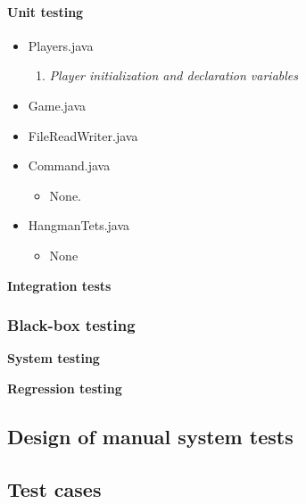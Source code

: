 \documentclass{article}
\begin{document}
\paragraph{Unit testing}%


\begin{itemize}
\item Players.java
\begin{enumerate}
\item
\textit{Player initialization and declaration variables}
\end{enumerate}


\item Game.java
\item FileReadWriter.java
\item Command.java


\begin{itemize}
\item None.
\end{itemize}

\item HangmanTets.java
\begin{itemize}
\item None
\end{itemize}
\end{itemize}


\textbf{Integration tests}



\subsubsection{Black-box testing}
\textbf{System testing\newline}


\textbf{Regression testing}%

\subsection{Design of manual system tests}


\subsection{Test cases}
\end{document}

